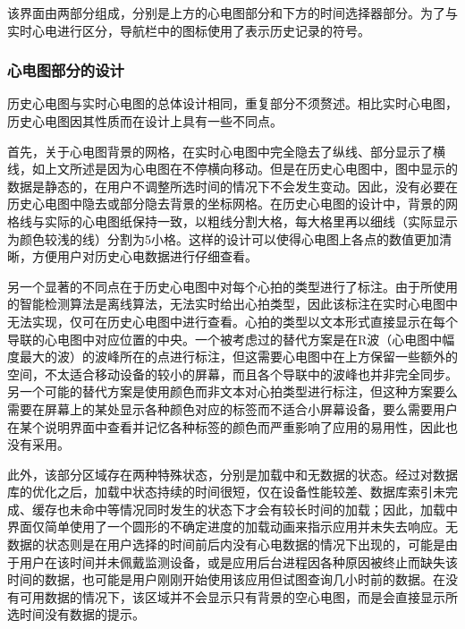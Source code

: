 \begin{figure}[ht]
    \label{fig:history}
\end{figure}

该界面由两部分组成，分别是上方的心电图部分和下方的时间选择器部分。为了与实时心电进行区分，导航栏中的图标使用了表示历史记录的符号。

\subsubsection{心电图部分的设计}\label{subsubsec:history-ecg-design}

历史心电图与实时心电图的总体设计相同，重复部分不须赘述。相比实时心电图，历史心电图因其性质而在设计上具有一些不同点。

首先，关于心电图背景的网格，在实时心电图中完全隐去了纵线、部分显示了横线，如上文所述是因为心电图在不停横向移动。但是在历史心电图中，图中显示的数据是静态的，在用户不调整所选时间的情况下不会发生变动。因此，没有必要在历史心电图中隐去或部分隐去背景的坐标网格。在历史心电图的设计中，背景的网格线与实际的心电图纸保持一致，以粗线分割大格，每大格里再以细线（实际显示为颜色较浅的线）分割为5小格。这样的设计可以使得心电图上各点的数值更加清晰，方便用户对历史心电数据进行仔细查看。

另一个显著的不同点在于历史心电图中对每个心拍的类型进行了标注。由于所使用的智能检测算法是离线算法，无法实时给出心拍类型，因此该标注在实时心电图中无法实现，仅可在历史心电图中进行查看。心拍的类型以文本形式直接显示在每个导联的心电图中对应位置的中央。一个被考虑过的替代方案是在R波（心电图中幅度最大的波）的波峰所在的点进行标注，但这需要心电图中在上方保留一些额外的空间，不太适合移动设备的较小的屏幕，而且各个导联中的波峰也并非完全同步。另一个可能的替代方案是使用颜色而非文本对心拍类型进行标注，但这种方案要么需要在屏幕上的某处显示各种颜色对应的标签而不适合小屏幕设备，要么需要用户在某个说明界面中查看并记忆各种标签的颜色而严重影响了应用的易用性，因此也没有采用。

此外，该部分区域存在两种特殊状态，分别是加载中和无数据的状态。经过对数据库的优化之后，加载中状态持续的时间很短，仅在设备性能较差、数据库索引未完成、缓存也未命中等情况同时发生的状态下才会有较长时间的加载；因此，加载中界面仅简单使用了一个圆形的不确定进度的加载动画来指示应用并未失去响应。无数据的状态则是在用户选择的时间前后内没有心电数据的情况下出现的，可能是由于用户在该时间并未佩戴监测设备，或是应用后台进程因各种原因被终止而缺失该时间的数据，也可能是用户刚刚开始使用该应用但试图查询几小时前的数据。在没有可用数据的情况下，该区域并不会显示只有背景的空心电图，而是会直接显示所选时间没有数据的提示。

